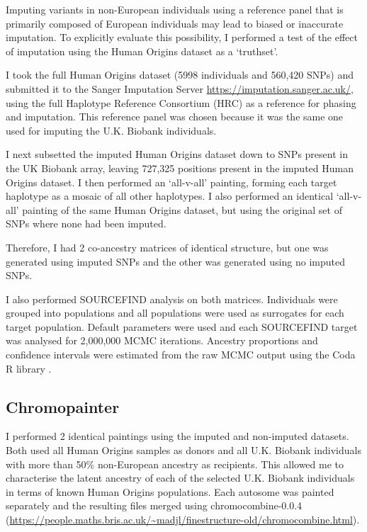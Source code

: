 Imputing variants in non-European individuals using a reference panel that is primarily composed of European individuals may lead to biased or inaccurate imputation. To explicitly evaluate this possibility, I performed a test of the effect of imputation using the Human Origins dataset as a `truthset'.
 
I took the full Human Origins dataset (5998 individuals and 560,420 SNPs) and submitted it to the Sanger Imputation Server \url{https://imputation.sanger.ac.uk/}, using the full Haplotype Reference Consortium (HRC) as a reference for phasing and imputation. This reference panel was chosen because it was the same one used for imputing the U.K. Biobank individuals.

I next subsetted the imputed Human Origins dataset down to SNPs present in the UK Biobank array, leaving 727,325 positions present in the imputed Human Origins dataset. I then performed an `all-v-all' painting, forming each target haplotype as a mosaic of all other haplotypes. I also performed an identical `all-v-all' painting of the same Human Origins dataset, but using the original set of SNPs where none had been imputed. 

Therefore, I had 2 co-ancestry matrices of identical structure, but one was generated using imputed SNPs and the other was generated using no imputed SNPs. 

I also performed SOURCEFIND analysis on both matrices. Individuals were grouped into populations and all populations were used as surrogates for each target population. Default parameters were used and each SOURCEFIND target was analysed for 2,000,000 MCMC iterations. Ancestry proportions and confidence intervals were estimated from the raw MCMC output using the Coda R library \cite{oro22547}.

\subsection{Chromopainter}

I performed 2 identical paintings using the imputed and non-imputed datasets. Both used all Human Origins samples as donors and all U.K. Biobank individuals with more than 50\% non-European ancestry as recipients. This allowed me to characterise the latent ancestry of each of the selected U.K. Biobank individuals in terms of known Human Origins populations. Each autosome was painted separately and the resulting files merged using chromocombine-0.0.4 (\url{https://people.maths.bris.ac.uk/~madjl/finestructure-old/chromocombine.html}).

